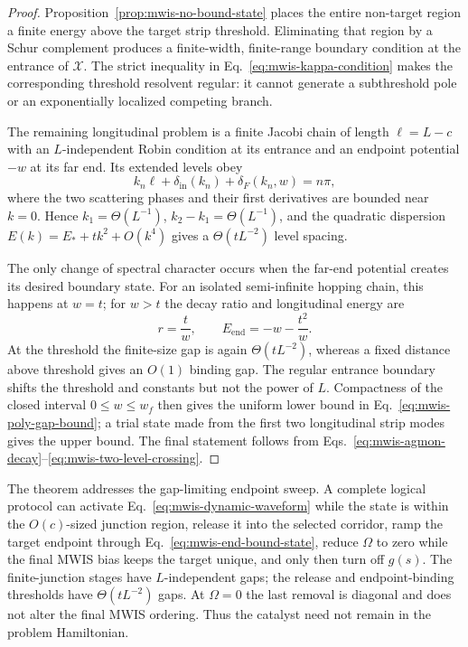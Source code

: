 \begin{proof}
Proposition~\ref{prop:mwis-no-bound-state} places the entire non-target region
a finite energy above the target strip threshold.  Eliminating that region by
a Schur complement produces a finite-width, finite-range boundary condition
at the entrance of $\mathcal X$.  The strict inequality in
Eq.~\eqref{eq:mwis-kappa-condition} makes the corresponding threshold
resolvent regular: it cannot generate a subthreshold pole or an exponentially
localized competing branch.

The remaining longitudinal problem is a finite Jacobi chain of length
$\ell=L-c$ with an $L$-independent Robin condition at its entrance and an
endpoint potential $-w$ at its far end.  Its extended levels obey
\begin{equation}
 k_n\ell+\delta_{\mathrm{in}}(k_n)
 +\delta_F(k_n,w)=n\pi,
 \label{eq:mwis-phase-quantization}
\end{equation}
where the two scattering phases and their first derivatives are bounded near
$k=0$.  Hence $k_1=\Theta(L^{-1})$,
$k_2-k_1=\Theta(L^{-1})$, and the quadratic dispersion
$E(k)=E_*+tk^2+O(k^4)$ gives a $\Theta(tL^{-2})$ level spacing.

The only change of spectral character occurs when the far-end potential
creates its desired boundary state.  For an isolated semi-infinite hopping
chain, this happens at $w=t$; for $w>t$ the decay ratio and longitudinal energy
are
\begin{equation}
 r=\frac{t}{w},\qquad
 E_{\mathrm{end}}=-w-\frac{t^2}{w}.
 \label{eq:mwis-end-bound-state}
\end{equation}
At the threshold the finite-size gap is again $\Theta(tL^{-2})$, whereas a
fixed distance above threshold gives an $O(1)$ binding gap.  The regular
entrance boundary shifts the threshold and constants but not the power of
$L$.  Compactness of the closed interval $0\leq w\leq w_f$ then gives the
uniform lower bound in Eq.~\eqref{eq:mwis-poly-gap-bound}; a trial state made
from the first two longitudinal strip modes gives the upper bound.  The final
statement follows from Eqs.~\eqref{eq:mwis-agmon-decay}--\eqref{eq:mwis-two-level-crossing}.
\end{proof}

The theorem addresses the gap-limiting endpoint sweep.  A complete logical
protocol can activate Eq.~\eqref{eq:mwis-dynamic-waveform} while the state is
within the $O(c)$-sized junction region, release it into the selected corridor,
ramp the target endpoint through Eq.~\eqref{eq:mwis-end-bound-state}, reduce
$\Omega$ to zero while the final MWIS bias keeps the target unique, and only
then turn off $g(s)$.  The finite-junction stages have $L$-independent gaps;
the release and endpoint-binding thresholds have $\Theta(tL^{-2})$ gaps.  At
$\Omega=0$ the last removal is diagonal and does not alter the final MWIS
ordering.  Thus the catalyst need not remain in the problem Hamiltonian.

